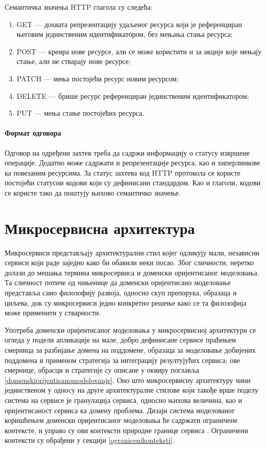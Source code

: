 \documentclass[12pt,oneside]{memoir}
\begin{document}
Семантичка значења HTTP глагола су следећа:
\begin{enumerate}
\item GET --- дохвата репрезентацију удаљеног ресурса који је референциран његовим јединственим идентификатором, без мењања стања ресурса;
\item POST --- креира нове ресурсе, али се може користити и за акције које мењају стање, али не стварају нове ресурсе;
\item PATCH --- мења постојећи ресурс новим ресурсом;
\item DELETE --- брише ресурс референциран јединственим идентификатором;
\item PUT --- мења стање постојећих ресурса.
\end{enumerate}

\subsubsection{Формат одговора}
Одговор на одређени захтев треба да садржи информацију о статусу извршене операције. Додатно може садржати и репрезентације ресурса, као и хиперлинкове ка повезаним ресурсима. За статус захтева код HTTP протокола се користе постојећи статусни кодови који су дефинисани стандардом. Као и глаголи, кодови се користе тако да поштују њихово семантичко значење.

\chapter{Микросервисна архитектура}\label{mikroservisi}
Микросервиси представљају архитектурални стил којег одликују мали, независни сервиси који раде заједно како би обавили неки посао. Због сличности, неретко долази до мешања термина микросервиса и доменски оријентисаног моделовања. Та сличност потиче од чињенице да доменски оријентисано моделовање представља само филозофију развоја, односно скуп препорука, образаца и циљева, док су микросервиси једно конкретно решење како се та филозофија може применити у стварности.

Употреба доменски оријентисаног моделовања у микросервисној архитектури се огледа у подели апликације на мале, добро дефинисане сервисе праћењем смерница за разбијање домена на поддомене, образаца за моделовање добијених поддомена и применом стратегија за интеграцију резултујућих сервиса; ове смернице, обрасци и стратегије су описане у оквиру поглавља \ref{domenskiorijentisanomodelovanje}. Оно што микросервисну архитектуру чини јединственом у односу на друге архитектуралне стилове који такође врше поделу система на сервисе је гранулација сервиса, односно њихова величина, као и оријентисаност сервиса ка домену проблема. Дизајн система моделованог коришћењем доменски оријентисаног моделовања ће садржати ограничене контексте, и управо су ови контексти природне границе сервиса \cite{netmicroservices}. Ограничени контексти су обрађени у секцији \ref{ogranicenikonteksti}.
\end{document}
